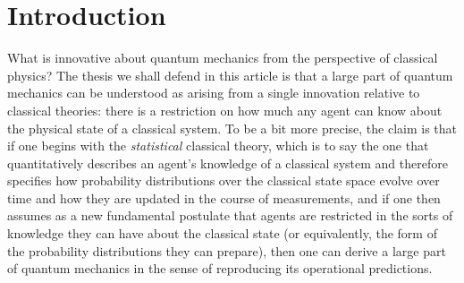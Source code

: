 \documentclass[pra,superscriptaddress,nofootinbib,12pt]{revtex4-2}
\begin{document}
\begin{abstract}
\end{abstract}

\maketitle


\newpage

\section{Introduction}

What is innovative about quantum mechanics from the perspective of classical
physics?  The thesis we shall defend in this article is that a large part
of quantum mechanics can be understood as arising from a single
innovation relative to classical theories: there is a restriction on how
much any agent can know about the physical state of a classical system.  To be a bit
more precise, the claim is that if one begins with the \emph{statistical}
classical theory, which is to say the one that quantitatively describes an
agent's knowledge of a classical system and therefore specifies how
probability distributions over the classical state space evolve over time
and how they are updated in the course of measurements, and if one then
assumes as a new fundamental postulate that agents are restricted in the
sorts of knowledge they can have about the classical state (or equivalently,
the form of the probability distributions they can prepare), then one can
derive a large part of quantum mechanics in the sense of reproducing its
operational predictions.
\end{document}
